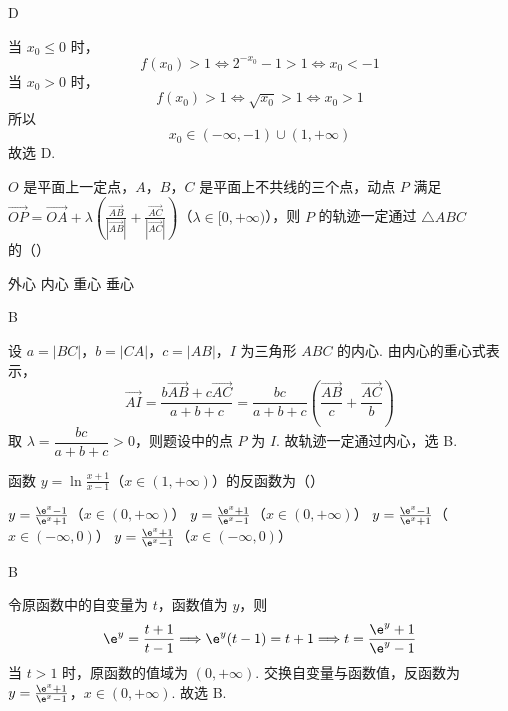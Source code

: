 \begin{answer}
D
\end{answer}

\begin{solution}
当 \(x_0\leqslant0\) 时，
\[
f(x_0)>1\Longleftrightarrow 2^{-x_0}-1>1\Longleftrightarrow x_0<-1
\]
当 \(x_0>0\) 时，
\[
f(x_0)>1\Longleftrightarrow \sqrt{x_0}>1\Longleftrightarrow x_0>1
\]
所以
\[
x_0\in(-\infty,-1)\cup(1,+\infty)
\]
故选 D.
\end{solution}

\begin{problem}
\(O\) 是平面上一定点，\(A\)，\(B\)，\(C\) 是平面上不共线的三个点，动点 \(P\) 满足 \(\overrightarrow{OP} = \overrightarrow{OA} + \lambda \left(\frac{\overrightarrow{AB}}{|\overrightarrow{AB}|} + \frac{\overrightarrow{AC}}{|\overrightarrow{AC}|}\right)\)（\(\lambda \in [0, +\infty)\)），则 \(P\) 的轨迹一定通过 \(\triangle ABC\) 的（\quad）

\choices
    {外心}
    {内心}
    {重心}
    {垂心}
\end{problem}

\begin{answer}
B
\end{answer}

\begin{solution}
设 \(a=|BC|\)，\(b=|CA|\)，\(c=|AB|\)，\(I\) 为三角形 \(ABC\) 的内心. 由内心的重心式表示，
\[
\overrightarrow{AI}=\frac{b\overrightarrow{AB}+c\overrightarrow{AC}}{a+b+c}=\frac{bc}{a+b+c}\left(\frac{\overrightarrow{AB}}{c}+\frac{\overrightarrow{AC}}{b}\right)
\]
取 \(\lambda=\dfrac{bc}{a+b+c}>0\)，则题设中的点 \(P\) 为 \(I\). 故轨迹一定通过内心，选 B.
\end{solution}

\begin{problem}
函数 \(y = \ln \frac{x + 1}{x - 1}\)（\(x \in (1, +\infty)\)）的反函数为（\quad）

\choices
    {\(y = \frac{\e^x - 1}{\e^x + 1}\)（\(x \in (0, +\infty)\)）}
    {\(y = \frac{\e^x + 1}{\e^x - 1}\)（\(x \in (0, +\infty)\)）}
    {\(y = \frac{\e^x - 1}{\e^x + 1}\)（\(x \in (-\infty, 0)\)）}
    {\(y = \frac{\e^x + 1}{\e^x - 1}\)（\(x \in (-\infty, 0)\)）}
\end{problem}

\begin{answer}
B
\end{answer}

\begin{solution}
令原函数中的自变量为 \(t\)，函数值为 \(y\)，则
\[
\e^y=\frac{t+1}{t-1}\Longrightarrow \e^y(t-1)=t+1\Longrightarrow t=\frac{\e^y+1}{\e^y-1}
\]
当 \(t>1\) 时，原函数的值域为 \((0,+\infty)\). 交换自变量与函数值，反函数为
\(y=\frac{\e^x+1}{\e^x-1}\)，\(x\in(0,+\infty)\).
故选 B.
\end{solution}

